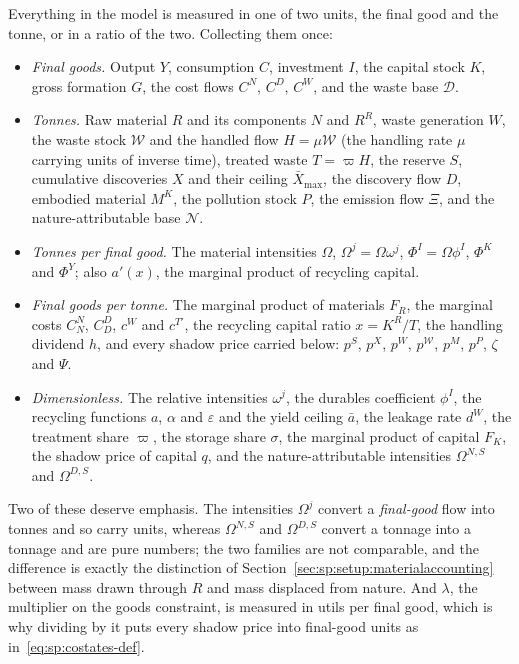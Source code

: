 Everything in the model is measured in one of two units, the final good and the tonne, or in a ratio of the two. Collecting them once:
\begin{itemize}
\item \emph{Final goods.} Output $Y$, consumption $C$, investment $I$, the capital stock $K$, gross formation $G$, the cost flows $C^N$, $C^D$, $C^W$, and the waste base $\mathcal D$.
\item \emph{Tonnes.} Raw material $R$ and its components $N$ and $R^R$, waste generation $W$, the waste stock $\mathcal W$ and the handled flow $H=\mu\mathcal W$ (the handling rate $\mu$ carrying units of inverse time), treated waste $T=\varpi H$, the reserve $S$, cumulative discoveries $X$ and their ceiling $\bar X_{\max}$, the discovery flow $D$, embodied material $M^K$, the pollution stock $P$, the emission flow $\Xi$, and the nature-attributable base $\mathcal N$.
\item \emph{Tonnes per final good.} The material intensities $\Omega$, $\Omega^j=\Omega\omega^j$, $\Phi^I=\Omega\phi^I$, $\Phi^K$ and $\Phi^Y$; also $a'\left(x\right)$, the marginal product of recycling capital.
\item \emph{Final goods per tonne.} The marginal product of materials $F_R$, the marginal costs $C^N_N$, $C^D_D$, $c^W$ and $c^{T\prime}$, the recycling capital ratio $x=K^R/T$, the handling dividend $h$, and every shadow price carried below: $p^S$, $p^X$, $p^W$, $p^{\mathcal W}$, $p^M$, $p^P$, $\zeta$ and $\Psi$.
\item \emph{Dimensionless.} The relative intensities $\omega^j$, the durables coefficient $\phi^I$, the recycling functions $a$, $\alpha$ and $\varepsilon$ and the yield ceiling $\bar a$, the leakage rate $d^W$, the treatment share $\varpi$, the storage share $\sigma$, the marginal product of capital $F_K$, the shadow price of capital $q$, and the nature-attributable intensities $\Omega^{N,S}$ and $\Omega^{D,S}$.
\end{itemize}
Two of these deserve emphasis. The intensities $\Omega^j$ convert a \emph{final-good} flow into tonnes and so carry units, whereas $\Omega^{N,S}$ and $\Omega^{D,S}$ convert a tonnage into a tonnage and are pure numbers; the two families are not comparable, and the difference is exactly the distinction of Section~\ref{sec:sp:setup:materialaccounting} between mass drawn through $R$ and mass displaced from nature. And $\lambda$, the multiplier on the goods constraint, is measured in utils per final good, which is why dividing by it puts every shadow price into final-good units as in~\eqref{eq:sp:costates-def}.

